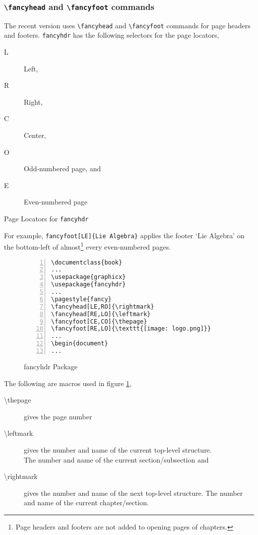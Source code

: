 \documentclass{article}
\begin{document}
\subsubsection{\texttt{\textbackslash fancyhead} and \texttt{\textbackslash fancyfoot} commands}
	The recent version uses \texttt{\textbackslash fancyhead} and \texttt{\textbackslash fancyfoot} commands for page headers and footers. \texttt{fancyhdr} has the following selectors for the page locators,
\begin{table}[h]
\centering
\begin{minipage}{0.45\textwidth}
\begin{description} 
	\item[L] Left,
	\item[R] Right,
	\item[C] Center,
\end{description}
\end{minipage}
\begin{minipage}{0.45\textwidth}
\begin{description} 
	\item[O] Odd-numbered page, and
	\item[E] Even-numbered page
\end{description}
\end{minipage}
\caption{Page Locators for \texttt{fancyhdr}}
\end{table}

	For example, \texttt{fancyfoot[LE]\{Lie Algebra\}} applies the footer `Lie Algebra' on the bottom-left of almost\footnote{Page headers and footers are not added to opening pages of chapters.} every even-numbered pages.

\begin{figure}[h]
\centering
\begin{Verbatim}[numbers = left]
\documentclass{book}
...
\usepackage{graphicx}
\usepackage{fancyhdr}
...
\pagestyle{fancy}
\fancyhead[LE,RO]{\rightmark}
\fancyhead[RE,LO]{\leftmark}
\fancyfoot[CE,CO]{\thepage}
\fancyfoot[RE,LO]{\texttt{[image: logo.png]}}
...
\begin{document}
...
\end{Verbatim}
\caption{fancyhdr Package}
\label{fig:fancyhdr}
\end{figure}

The following are macros used in figure \ref{fig:fancyhdr},
\begin{description}
	\item[\textbackslash thepage] gives the page number
	\item[\textbackslash leftmark] gives the number and name of the current top-level structure.\\ The number and name of the current section/subsection and
	\item[\textbackslash rightmark] gives the number and name of the next top-level structure. The number and name of the current chapter/section.
\end{description}
\end{document}
